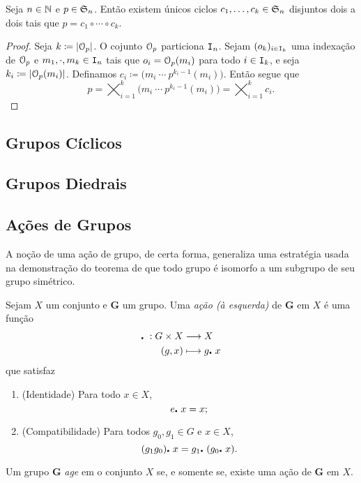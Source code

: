 \begin{prop}
	Seja $n \in \mathbb{N}$ e $p \in \mathfrak{S}_n$. Então existem únicos ciclos $c_1,\ldots,c_k \in \mathfrak{S}_n$ disjuntos dois a dois tais que $p=c_1 \circ \cdots \circ c_k$.
\end{prop}
\begin{proof}
	Seja $k \coloneqq \left\vert{\mathcal{O}_p}\right\vert$. O cojunto $\mathcal{O}_p$ particiona $\mathtt I_n$. Sejam $(o_k)_{i \in \mathtt I_k}$ uma indexação de $\mathcal{O}_p$ e $m_1,\cdot,m_k \in \mathtt I_n$ tais que $o_i=\mathcal{O}_p(m_i)$ para todo $i \in \mathtt I_k$, e seja $k_i \coloneqq \left\vert{\mathcal{O}_p(m_i)}\right\vert$. Definamos $c_i \coloneqq  \bigl( m_i \ \cdots \  p^{k_i-1}(m_i)\bigr)$. Então segue que
	\begin{equation*}
	p = \bigtimes_{i=1}^k \bigl( m_i \ \cdots \  p^{k_i-1}(m_i)\bigr) = \bigtimes_{i=1}^k c_i.
	\end{equation*}
\end{proof}



\subsection{Grupos Cíclicos}

\subsection{Grupos Diedrais}


\cleardoublepage
\subsection{Ações de Grupos}

A noção de uma ação de grupo, de certa forma, generaliza uma estratégia usada na demonstração do teorema de que todo grupo é isomorfo a um subgrupo de seu grupo simétrico.

\begin{defi}
Sejam $X$ um conjunto e $\bm G$ um grupo. Uma \emph{ação (à esquerda)} de $\bm G$ em $X$ é uma função
	\begin{align*}
	{\mathord{\centerdot}\ }: {G \times X} &\longrightarrow {X} \\{(g,x)} &\longmapsto {g\mathord{\centerdot}\ x}
	\end{align*}
que satisfaz
\begin{enumerate}
\item (Identidade) Para todo $x \in X$,
	\begin{equation*}
	e \mathord{\centerdot}\  x = x;
	\end{equation*}
\item (Compatibilidade) Para todos $g_0,g_1 \in G$ e $x \in X$,
	\begin{equation*}
	(g_1g_0) \mathord{\centerdot}\  x = g_1 \mathord{\centerdot}\  (g_0 \mathord{\centerdot}\  x).
	\end{equation*}
\end{enumerate}
Um grupo $\bm G$ \emph{age} em o conjunto $X$ se, e somente se, existe uma ação de $\bm G$ em $X$.
\end{defi}

